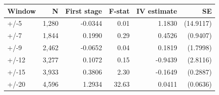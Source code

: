 \begin{tabular}{lrrrrr}
\toprule
Window & N & First stage & F-stat & IV estimate & SE \\
\midrule
+/-5 & 1,280 & -0.0344 & 0.01 & 1.1830 & (14.9117) \\
+/-7 & 1,844 & 0.1990 & 0.29 & 0.4526 & (0.9407) \\
+/-9 & 2,462 & -0.0652 & 0.04 & 0.1819 & (1.7998) \\
+/-12 & 3,277 & 0.1072 & 0.15 & -0.9439 & (2.8116) \\
+/-15 & 3,933 & 0.3806 & 2.30 & -0.1649 & (0.2887) \\
+/-20 & 4,596 & 1.2934 & 32.63 & 0.0411 & (0.0636) \\
\bottomrule
\end{tabular}
